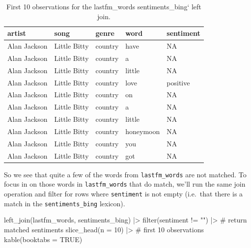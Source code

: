 \documentclass[
  letterpaper,
]{latex/krantz}
\newenvironment{Shaded}{\begin{snugshade}}{\end{snugshade}}
\newcommand{\AttributeTok}[1]{\textcolor[rgb]{0.40,0.45,0.13}{#1}}
\newcommand{\CommentTok}[1]{\textcolor[rgb]{0.37,0.37,0.37}{#1}}
\newcommand{\ConstantTok}[1]{\textcolor[rgb]{0.56,0.35,0.01}{#1}}
\newcommand{\DecValTok}[1]{\textcolor[rgb]{0.68,0.00,0.00}{#1}}
\newcommand{\FunctionTok}[1]{\textcolor[rgb]{0.28,0.35,0.67}{#1}}
\newcommand{\NormalTok}[1]{\textcolor[rgb]{0.00,0.23,0.31}{#1}}
\newcommand{\SpecialCharTok}[1]{\textcolor[rgb]{0.37,0.37,0.37}{#1}}
\newcommand{\StringTok}[1]{\textcolor[rgb]{0.13,0.47,0.30}{#1}}
\begin{document}
\hypertarget{tbl-td-lastfm-words-bing-left-joing}{}
\begin{table}
\caption{\label{tbl-td-lastfm-words-bing-left-joing}First 10 observations for the lastfm\_words sentiments\_bing` left join. }\tabularnewline

\centering
\begin{tabular}{lllll}
\toprule
artist & song & genre & word & sentiment\\
\midrule
Alan Jackson & Little Bitty & country & have & NA\\
Alan Jackson & Little Bitty & country & a & NA\\
Alan Jackson & Little Bitty & country & little & NA\\
Alan Jackson & Little Bitty & country & love & positive\\
Alan Jackson & Little Bitty & country & on & NA\\
\addlinespace
Alan Jackson & Little Bitty & country & a & NA\\
Alan Jackson & Little Bitty & country & little & NA\\
Alan Jackson & Little Bitty & country & honeymoon & NA\\
Alan Jackson & Little Bitty & country & you & NA\\
Alan Jackson & Little Bitty & country & got & NA\\
\bottomrule
\end{tabular}
\end{table}

So we see that quite a few of the words from \texttt{lastfm\_words} are
not matched. To focus in on those words in \texttt{lastfm\_words} that
do match, we'll run the same join operation and filter for rows where
\texttt{sentiment} is not empty (i.e.~that there is a match in the
\texttt{sentiments\_bing} lexicon).

\begin{Shaded}
\begin{Highlighting}[]
\FunctionTok{left\_join}\NormalTok{(lastfm\_words, sentiments\_bing) }\SpecialCharTok{|\textgreater{}}
  \FunctionTok{filter}\NormalTok{(sentiment }\SpecialCharTok{!=} \StringTok{""}\NormalTok{) }\SpecialCharTok{|\textgreater{}} \CommentTok{\# return matched sentiments}
  \FunctionTok{slice\_head}\NormalTok{(}\AttributeTok{n =} \DecValTok{10}\NormalTok{) }\SpecialCharTok{|\textgreater{}} \CommentTok{\# first 10 observations}
  \FunctionTok{kable}\NormalTok{(}\AttributeTok{booktabs =} \ConstantTok{TRUE}\NormalTok{)}
\end{Highlighting}
\end{Shaded}
\end{document}
